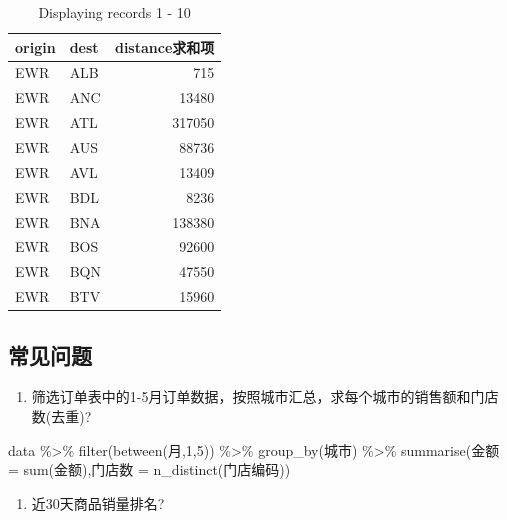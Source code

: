 \documentclass[
]{book}
\newenvironment{Shaded}{\begin{snugshade}}{\end{snugshade}}
\newcommand{\DecValTok}[1]{\textcolor[rgb]{0.00,0.00,0.81}{#1}}
\newcommand{\FunctionTok}[1]{\textcolor[rgb]{0.00,0.00,0.00}{#1}}
\newcommand{\NormalTok}[1]{#1}
\newcommand{\OtherTok}[1]{\textcolor[rgb]{0.56,0.35,0.01}{#1}}
\newcommand{\SpecialCharTok}[1]{\textcolor[rgb]{0.00,0.00,0.00}{#1}}
\providecommand{\tightlist}{%
  \setlength{\itemsep}{0pt}\setlength{\parskip}{0pt}}
\begin{document}
\begin{table}

\caption{\label{tab:unnamed-chunk-62}Displaying records 1 - 10}
\centering
\begin{tabular}[t]{l|l|r}
\hline
origin & dest & distance求和项\\
\hline
EWR & ALB & 715\\
\hline
EWR & ANC & 13480\\
\hline
EWR & ATL & 317050\\
\hline
EWR & AUS & 88736\\
\hline
EWR & AVL & 13409\\
\hline
EWR & BDL & 8236\\
\hline
EWR & BNA & 138380\\
\hline
EWR & BOS & 92600\\
\hline
EWR & BQN & 47550\\
\hline
EWR & BTV & 15960\\
\hline
\end{tabular}
\end{table}

\hypertarget{ux5e38ux89c1ux95eeux9898}{%
\subsection{常见问题}\label{ux5e38ux89c1ux95eeux9898}}

\begin{enumerate}
\def\labelenumi{\arabic{enumi}.}
\tightlist
\item
  筛选订单表中的1-5月订单数据，按照城市汇总，求每个城市的销售额和门店数(去重)?
\end{enumerate}

\begin{Shaded}
\begin{Highlighting}[]
\NormalTok{data }\SpecialCharTok{\%\textgreater{}\%} 
  \FunctionTok{filter}\NormalTok{(}\FunctionTok{between}\NormalTok{(月,}\DecValTok{1}\NormalTok{,}\DecValTok{5}\NormalTok{)) }\SpecialCharTok{\%\textgreater{}\%} 
  \FunctionTok{group\_by}\NormalTok{(城市) }\SpecialCharTok{\%\textgreater{}\%} 
  \FunctionTok{summarise}\NormalTok{(金额 }\OtherTok{=} \FunctionTok{sum}\NormalTok{(金额),门店数 }\OtherTok{=} \FunctionTok{n\_distinct}\NormalTok{(门店编码))}
\end{Highlighting}
\end{Shaded}

\begin{enumerate}
\def\labelenumi{\arabic{enumi}.}
\setcounter{enumi}{1}
\tightlist
\item
  近30天商品销量排名?
\end{enumerate}
\end{document}

